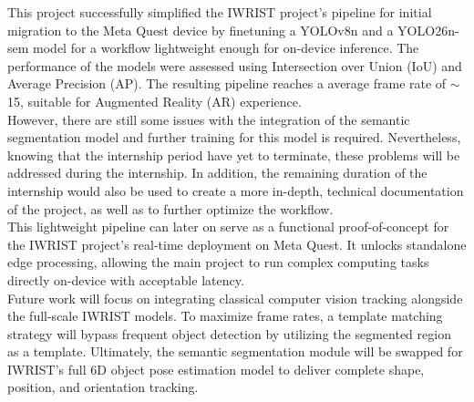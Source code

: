 \documentclass{article}
\begin{document}
This project successfully simplified the IWRIST project's pipeline for initial migration to the Meta Quest device by finetuning a YOLOv8n and a YOLO26n-sem model for a workflow lightweight enough for on-device inference. The performance of the models were assessed using Intersection over Union (IoU) and Average Precision (AP). The resulting pipeline reaches a average frame rate of $\sim$15, suitable for Augmented Reality (AR) experience. \\

However, there are still some issues with the integration of the semantic segmentation model and further training for this model is required. Nevertheless, knowing that the internship period have yet to terminate, these problems will be addressed during the internship. In addition, the remaining duration of the internship would also be used to create a more in-depth, technical documentation of the project, as well as to further optimize the workflow.\\


This lightweight pipeline can later on serve as a functional proof-of-concept for the IWRIST project's real-time deployment on Meta Quest. It unlocks standalone edge processing, allowing the main project to run complex computing tasks directly on-device with acceptable latency.\\

Future work will focus on integrating classical computer vision tracking alongside the full-scale IWRIST models. To maximize frame rates, a template matching strategy will bypass frequent object detection by utilizing the segmented region as a template. Ultimately, the semantic segmentation module will be swapped for IWRIST's full 6D object pose estimation model to deliver complete shape, position, and orientation tracking.

\newpage


\end{document}
